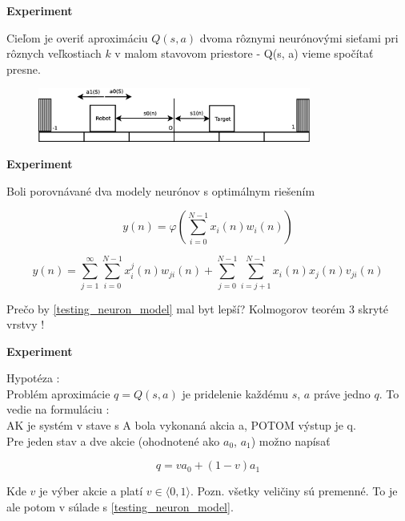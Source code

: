 \documentclass[xcolor=dvipsnames]{beamer}
\begin{document}
\begin{frame}{\bf Experiment}

Cieľom je overiť aproximáciu $Q(s, a)$ dvoma rôznymi neurónovými sieťami pri
rôznych veľkostiach $k$ v malom stavovom priestore - Q(s, a) vieme spočítať presne.

\begin{figure}[ht]
\begin{center}
\includegraphics[width=0.8\textwidth]{diagrams/1D_robot_diagram.eps}
\end{center}
\end{figure}

\end{frame}



\begin{frame}{\bf Experiment}

Boli porovnávané dva modely neurónov s optimálnym riešením

\begin{equation}
\label{mcculloch_pitts_model}
  y(n) = \varphi(\sum_{i = 0}^{N-1} x_i(n)w_i(n))
\end{equation}


\begin{equation}
\label{testing_neuron_model}
  y(n) = \sum_{j = 1}^{\infty}{\sum_{i = 0}^{N-1} x_i^j(n)w_{ji}(n)} +
  \sum_{j = 0}^{N-1}{\sum_{i = j + 1}^{N-1} x_i(n)x_j(n)v_{ji}(n)}
\end{equation}

Prečo by \ref{testing_neuron_model} mal byt lepší? Kolmogorov teorém 3 skryté vrstvy !

\end{frame}


\begin{frame}{\bf Experiment}

Hypotéza : \\
\bigskip
Problém aproximácie $q = Q(s, a)$ je pridelenie každému $s$, $a$ práve jedno $q$.
To vedie na formuláciu : \\
AK je systém v stave s A bola vykonaná akcia a, POTOM výstup je q. \\
\bigskip
Pre jeden stav a dve akcie (ohodnotené ako $a_0$, $a_1$) možno napísať

\begin{equation}
\label{multiplexer}
  q =  v a_0 + (1 - v) a_1
\end{equation}

Kde $v$ je výber akcie a platí $v \in \langle 0, 1 \rangle$. Pozn. všetky veličiny
sú premenné.
\bigskip
To je ale potom v súlade s \ref{testing_neuron_model}.

\end{frame}
\end{document}
